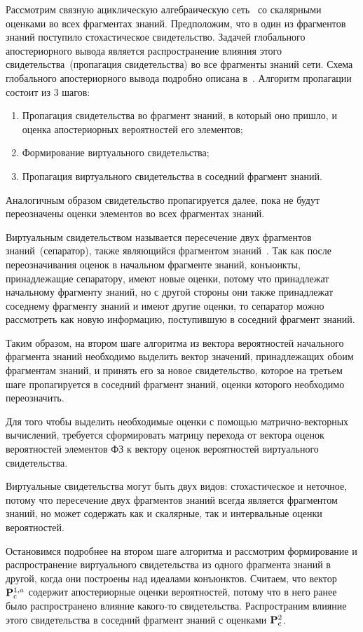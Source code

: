 Рассмотрим связную ациклическую алгебраическую сеть~\cite{284} со скалярными оценками во всех фрагментах знаний. Предположим, что в один из фрагментов знаний поступило стохастическое свидетельство. Задачей глобального апостериорного вывода является распространение влияния этого свидетельства~(пропагация свидетельства) во все фрагменты знаний сети. Схема глобального апостериорного вывода подробно описана в~\cite{93}.
 Алгоритм пропагации состоит из 3 шагов: 
\begin{enumerate}
	\item  Пропагация свидетельства во фрагмент знаний, в который оно пришло, и оценка апостериорных вероятностей его элементов;
	\item Формирование виртуального свидетельства;
	\item Пропагация виртуального свидетельства в соседний фрагмент знаний.
\end{enumerate}

Аналогичным образом свидетельство пропагируется далее, пока не будут переозначены оценки элементов во всех фрагментах знаний.

Виртуальным свидетельством называется пересечение двух фрагментов знаний~(сепаратор), также являющийся фрагментом знаний~\cite{51, 93}. Так как после переозначивания оценок в начальном фрагменте знаний, конъюнкты, принадлежащие сепаратору, имеют новые оценки, потому что принадлежат начальному фрагменту знаний, но с другой стороны они также принадлежат соседнему фрагменту знаний и имеют другие оценки, то сепаратор можно рассмотреть как новую информацию, поступившую в соседний фрагмент знаний. 

Таким образом, на втором шаге алгоритма из вектора вероятностей начального фрагмента знаний необходимо выделить вектор значений, принадлежащих обоим фрагментам знаний, и принять его за новое свидетельство, которое на третьем шаге пропагируется в соседний фрагмент знаний, оценки которого необходимо переозначить.

Для того чтобы выделить необходимые оценки с помощью матрично-векторных вычислений, требуется сформировать матрицу перехода от вектора оценок вероятностей элементов ФЗ к вектору оценок вероятностей виртуального свидетельства.

Виртуальные свидетельства могут быть двух видов: стохастическое и неточное, потому что пересечение двух фрагментов знаний всегда является фрагментом знаний, но может содержать как и скалярные, так и интервальные оценки вероятностей.

Остановимся подробнее на втором шаге алгоритма и рассмотрим формирование и распространение виртуального свидетельства из одного фрагмента знаний в другой, когда они построены над идеалами конъюнктов. Считаем, что вектор $\mathbf{P}_\mathrm{c}^{1, a}$ содержит апостериорные оценки вероятностей, потому что в него ранее было распространено влияние какого-то свидетельства. Распространим влияние этого свидетельства в соседний фрагмент знаний с оценками $\mathbf{P}_\mathrm{c}^2$.

